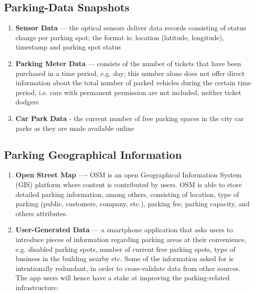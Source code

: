 \documentclass{article}
\begin{document}
\subsection{Parking-Data Snapshots}
\label{parking-data-snapshots}
\begin{enumerate}
\item \textbf{Sensor Data} --- the optical sensors deliver data records consisting of status change per parking spot; the format is: location (latitude, longitude), timestamp and parking spot status
\item \textbf{Parking Meter Data} --- consists of the number of tickets that have been purchased in a time period, e.g. day; this number alone does not offer direct information about the total number of parked vehicles during the certain time period, i.e. cars with permanent permission are not included, neither ticket dodgers
\item \textbf{Car Park Data} - the current number of free parking spaces in the city car parks as they are made available online
\end{enumerate}

\subsection{Parking Geographical Information}
\label{parking-geo-info}
\begin{enumerate}
\item \textbf{Open Street Map} ---- OSM is an open Geographical Information System (GIS) platform where content is contributed by users. OSM is able to store detailed parking information, among others, consisting of location, type of parking (public, customers, company, etc.), parking fee, parking capacity, and others attributes.
\item \textbf{User-Generated Data} --- a smartphone application that asks users to introduce pieces of information regarding parking areas at their convenience, e.g. disabled parking spots, number of current free parking spots, type of business in the building nearby etc. Some of the information asked for is intentionally redundant, in order to cross-validate data from other sources. The app users will hence have a stake at improving the parking-related infrastructure. 
\end{enumerate}
\end{document}
